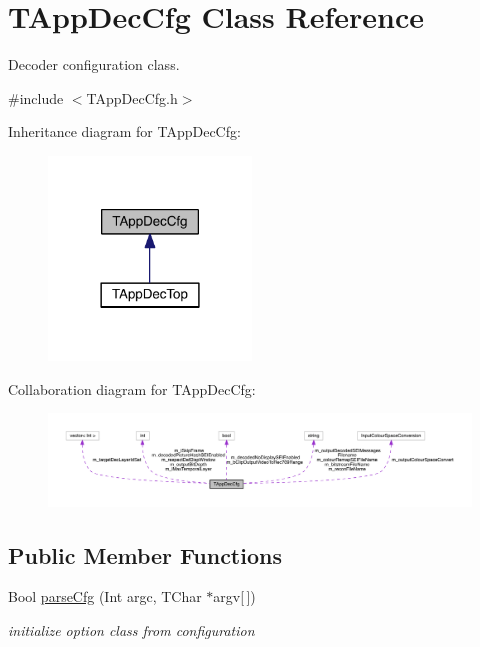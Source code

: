 \hypertarget{class_t_app_dec_cfg}{}\section{T\+App\+Dec\+Cfg Class Reference}
\label{class_t_app_dec_cfg}


Decoder configuration class.  




{\ttfamily \#include $<$T\+App\+Dec\+Cfg.\+h$>$}



Inheritance diagram for T\+App\+Dec\+Cfg\+:
\nopagebreak
\begin{figure}[H]
\begin{center}
\leavevmode
\includegraphics[width=153pt]{d9/de8/class_t_app_dec_cfg__inherit__graph}
\end{center}
\end{figure}


Collaboration diagram for T\+App\+Dec\+Cfg\+:
\nopagebreak
\begin{figure}[H]
\begin{center}
\leavevmode
\includegraphics[width=350pt]{d8/dc2/class_t_app_dec_cfg__coll__graph}
\end{center}
\end{figure}
\subsection*{Public Member Functions}
{\bf }\par
\begin{DoxyCompactItemize}
\item 
Bool \hyperlink{class_t_app_dec_cfg_a838166e6f987ee444b97f9f244770132}{parse\+Cfg} (Int argc, T\+Char $\ast$argv\mbox{[}$\,$\mbox{]})
\begin{DoxyCompactList}\small\item\em initialize option class from configuration \end{DoxyCompactList}\end{DoxyCompactItemize}


